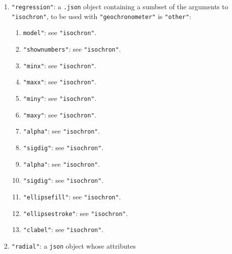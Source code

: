 \begin{refsection}
\begin{enumerate}[leftmargin=\parindent,align=left,
      labelwidth=\parindent,label*=2.\arabic*.]
\begin{enumerate}[leftmargin=\parindent,align=left,
      labelwidth=\parindent,label*=\arabic*.]
      \item{\tt "minx"}: either \texttt{"auto"} or a number marking the
        first value of the \texttt{xlim} argument in the
        \texttt{isochron()} function.
      \item{\tt "maxx"}: either \texttt{"auto"} or a number marking the
        second value of the \texttt{xlim} argument in the
        \texttt{isochron()} function.
      \item{\tt "miny"}: either \texttt{"auto"} or a number marking the
        first value of the \texttt{ylim} argument in the
        \texttt{isochron()} function.
      \item{\tt "maxy"}: either \texttt{"auto"} or a number marking the
        second value of the \texttt{ylim} argument in the
        \texttt{isochron()} function.
      \item{\tt growth"}: \texttt{"TRUE"} or \texttt{"FALSE"}.
  \end{enumerate}
\item{\tt "regression"}: a \texttt{.json} object containing a sumbset
  of the arguments to \texttt{"isochron"}, to be used with
  \texttt{"geochronometer"} is \texttt{"other"}:
  \begin{enumerate}[leftmargin=\parindent,align=left,
      labelwidth=\parindent,label*=\arabic*.]
  \item{\tt model"}: see \texttt{"isochron"}.
  \item{\tt "shownumbers"}: see \texttt{"isochron"}.
  \item{\tt "minx"}: see \texttt{"isochron"}.
  \item{\tt "maxx"}: see \texttt{"isochron"}.
  \item{\tt "miny"}: see \texttt{"isochron"}.
  \item{\tt "maxy"}: see \texttt{"isochron"}.
  \item{\tt "alpha"}: see \texttt{"isochron"}.
  \item{\tt "sigdig"}: see \texttt{"isochron"}.
  \item{\tt "alpha"}: see \texttt{"isochron"}.
  \item{\tt "sigdig"}: see \texttt{"isochron"}.
  \item{\tt "ellipsefill"}: see \texttt{"isochron"}.
  \item{\tt "ellipsestroke"}: see \texttt{"isochron"}.
  \item{\tt "clabel"}: see \texttt{"isochron"}.
  \end{enumerate}
\item{\tt "radial"}: a \texttt{json} object whose attributes

\end{enumerate}
\end{refsection}
